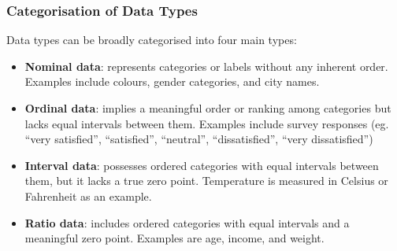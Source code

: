 \documentclass{article}\usepackage[]{graphicx}\usepackage[]{xcolor}
\begin{document}
\subsubsection{Categorisation of Data Types}
Data types can be broadly categorised into four main types: 
\begin{itemize}
    \item \textbf{Nominal data}: represents categories or labels without any inherent order. Examples include colours, gender categories, and city names. 
    \item \textbf{Ordinal data}: implies a meaningful order or ranking among categories but lacks equal intervals between them. Examples include survey responses (eg. “very satisfied”, “satisfied”, “neutral”, “dissatisfied”, “very dissatisfied”)
    \item \textbf{Interval data}: possesses ordered categories with equal intervals between them, but it lacks a true zero point. Temperature is measured in Celsius or Fahrenheit as an example. 
    \item \textbf{Ratio data}: includes ordered categories with equal intervals and a meaningful zero point. Examples are age, income, and weight. 
\end{itemize}
\end{document}
